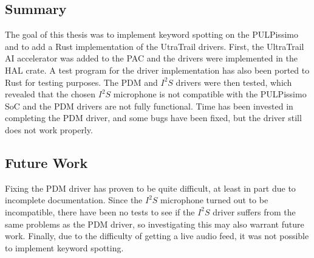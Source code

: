 
\subsection{Summary}

The goal of this thesis was to implement keyword spotting on the PULPissimo and to add a Rust implementation of the UtraTrail drivers.
First, the UltraTrail AI accelerator was added to the PAC and the drivers were implemented in the HAL crate.
A test program for the driver implementation has also been ported to Rust for testing purposes.
The PDM and $I^2S$ drivers were then tested, which revealed that the chosen $I^2S$
microphone is not compatible with the PULPissimo SoC and the PDM drivers are not fully functional.
Time has been invested in completing the PDM driver, and some bugs have been fixed, but the driver still does not work properly.

\subsection{Future Work}

Fixing the PDM driver has proven to be quite difficult, at least in part due to incomplete documentation.
Since the $I^2S$ microphone turned out to be incompatible, there have been no tests to see if the $I^2S$
driver suffers from the same problems as the PDM driver, so investigating this may also warrant future work.
Finally, due to the difficulty of getting a live audio feed, it was not possible to implement keyword spotting.
